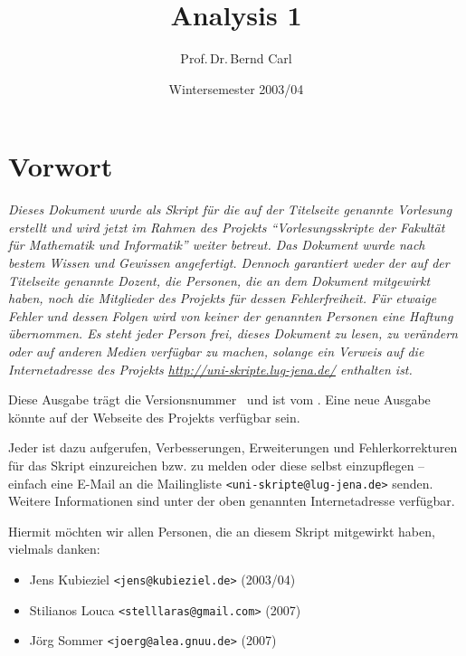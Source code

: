 \documentclass[ngerman,titlepage,twoside, parskip=half*]{scrreprt}
\theoremstyle{break}
\theoremstyle{nonumberbreak}
\begin{document}
\title{Analysis 1}
\author{Prof.\,Dr.\,Bernd Carl}
\date{Wintersemester 2003/04}

\maketitle

\clearpage
\chapter*{Vorwort}

{\itshape
  Dieses Dokument wurde als Skript für die auf der Titelseite genannte
  Vorlesung erstellt und wird jetzt im Rahmen des Projekts "`Vorlesungsskripte
  der Fakultät für Mathematik und Informatik"' weiter betreut. Das Dokument
  wurde nach bestem Wissen und Gewissen angefertigt. Dennoch garantiert weder
  der auf der Titelseite genannte Dozent, die Personen, die an dem Dokument
  mitgewirkt haben, noch die Mitglieder des Projekts für dessen
  Fehlerfreiheit. Für etwaige Fehler und dessen Folgen wird von keiner der
  genannten Personen eine Haftung übernommen. Es steht jeder Person frei,
  dieses Dokument zu lesen, zu verändern oder auf anderen Medien verfügbar zu
  machen, solange ein Verweis auf die Internetadresse des Projekts
  \url{http://uni-skripte.lug-jena.de/} enthalten ist.

  Diese Ausgabe trägt die Versionsnummer~\SVNLastChangedRevision{} und ist vom
  \SVNDate{}. Eine neue Ausgabe könnte auf der Webseite des Projekts
  verfügbar sein.

  Jeder ist dazu aufgerufen, Verbesserungen, Erweiterungen und
  Fehlerkorrekturen für das Skript einzureichen bzw. zu melden oder diese
  selbst einzupflegen -- einfach eine E-Mail an die Mailingliste
  \texttt{<uni-skripte@lug-jena.de>} senden. Weitere Informationen sind
  unter der oben genannten Internetadresse verfügbar.

  Hiermit möchten wir allen Personen, die an diesem Skript mitgewirkt haben,
  vielmals danken:
  \begin{itemize}
   \item Jens Kubieziel \texttt{<jens@kubieziel.de>} (2003/04)
   \item Stilianos Louca \texttt{<stelllaras@gmail.com>} (2007)
   \item Jörg Sommer \texttt{<joerg@alea.gnuu.de>} (2007)
  \end{itemize}
}

\tableofcontents{}
\end{document}
